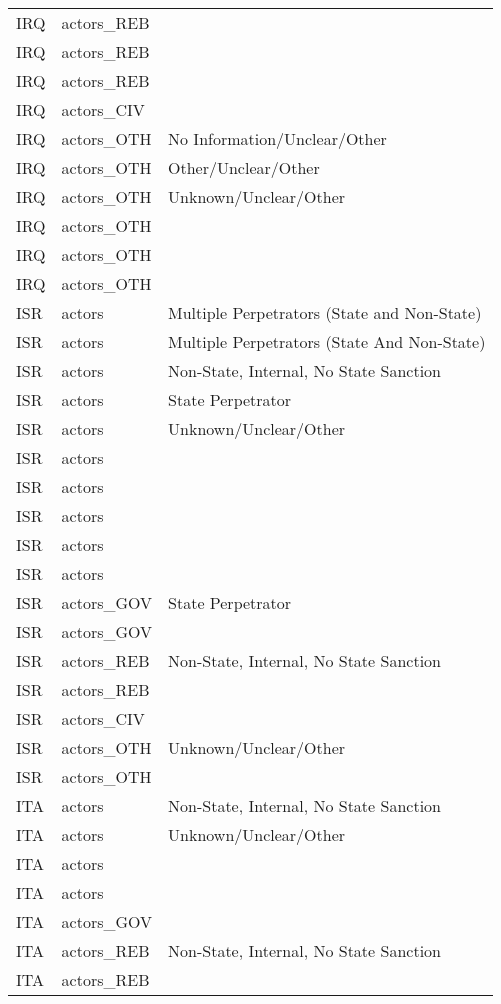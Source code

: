 \begin{table}[ht]
\begin{tabular}{lll}
  IRQ & actors\_REB &  \\ 
  IRQ & actors\_REB &  \\ 
  IRQ & actors\_REB &  \\ 
  IRQ & actors\_CIV &  \\ 
  IRQ & actors\_OTH & No Information/Unclear/Other \\ 
  IRQ & actors\_OTH & Other/Unclear/Other \\ 
  IRQ & actors\_OTH & Unknown/Unclear/Other \\ 
  IRQ & actors\_OTH &  \\ 
  IRQ & actors\_OTH &  \\ 
  IRQ & actors\_OTH &  \\ 
  ISR & actors & Multiple Perpetrators (State and Non-State) \\ 
  ISR & actors & Multiple Perpetrators (State And Non-State) \\ 
  ISR & actors & Non-State, Internal, No State Sanction \\ 
  ISR & actors & State Perpetrator \\ 
  ISR & actors & Unknown/Unclear/Other \\ 
  ISR & actors &  \\ 
  ISR & actors &  \\ 
  ISR & actors &  \\ 
  ISR & actors &  \\ 
  ISR & actors &  \\ 
  ISR & actors\_GOV & State Perpetrator \\ 
  ISR & actors\_GOV &  \\ 
  ISR & actors\_REB & Non-State, Internal, No State Sanction \\ 
  ISR & actors\_REB &  \\ 
  ISR & actors\_CIV &  \\ 
  ISR & actors\_OTH & Unknown/Unclear/Other \\ 
  ISR & actors\_OTH &  \\ 
  ITA & actors & Non-State, Internal, No State Sanction \\ 
  ITA & actors & Unknown/Unclear/Other \\ 
  ITA & actors &  \\ 
  ITA & actors &  \\ 
  ITA & actors\_GOV &  \\ 
  ITA & actors\_REB & Non-State, Internal, No State Sanction \\ 
  ITA & actors\_REB &  \\ 

\end{tabular}
\end{table}
